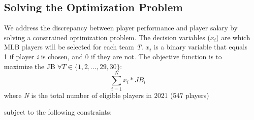 \documentclass{article}
\begin{document}
\subsection{Solving the Optimization Problem}

We address the discrepancy between player performance and player salary by solving a constrained optimization problem. The decision variables ($x_{i}$) are which MLB players will be selected for each team \emph{T}. $x_{i}$ is a binary variable that equals 1 if player \emph{i} is chosen, and 0 if they are not. The objective function is to maximize the JB $\forall T \in {\{1, 2, \dots,29, 30}\}$:
\begin{equation}
\sum_{i = 1}^{N} x_{i} * JB_{i}
\end{equation} where \emph{N} is the total number of eligible players in 2021 (547 players)

subject to the following constraints:
\end{document}
